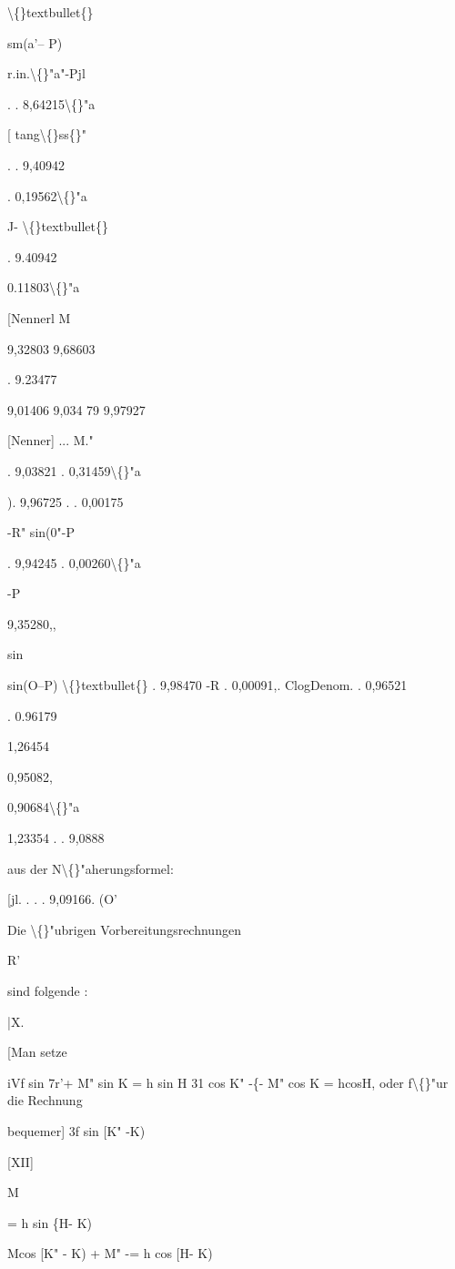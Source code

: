 \documentclass[10pt,a4paper]{article}
\begin{document}
\textbackslash\{\}textbullet\{\}

sm(a'-- P)

r.in.\textbackslash\{\}"a"-Pjl

. . 8,64215\textbackslash\{\}"a

[ tang\textbackslash\{\}ss\{\}"

. . 9,40942

. 0,19562\textbackslash\{\}"a

J- \textbackslash\{\}textbullet\{\}

. 9.40942

0.11803\textbackslash\{\}"a

[Nennerl
M

9,32803
9,68603

. 9.23477

9,01406
9,034 79
9,97927

[Nenner]
...
M."

. 9,03821
. 0,31459\textbackslash\{\}"a

). 9,96725
. . 0,00175

-R"
sin(0"-P

. 9,94245
. 0,00260\textbackslash\{\}"a

-P

9,35280,,

sin

sin(O--P) \textbackslash\{\}textbullet\{\} . 9,98470
-R
. 0,00091,.
ClogDenom. . 0,96521

. 0.96179

1,26454

0,95082,

0,90684\textbackslash\{\}"a

1,23354
. . 9,0888

aus der N\textbackslash\{\}"aherungsformel:

[jl. . . . 9,09166.
(O'

Die \textbackslash\{\}"ubrigen Vorbereitungsrechnungen

R'

sind folgende :

|X.

[Man setze

iVf sin 7r'+ M" sin K = h sin H
31 cos K" -\{- M" cos K = hcosH,
oder f\textbackslash\{\}"ur die Rechnung

bequemer]
3f sin [K" -K)

[XII]

M

= h sin \{H- K)

Mcos [K" - K) + M" -= h cos [H- K)
\end{document}
